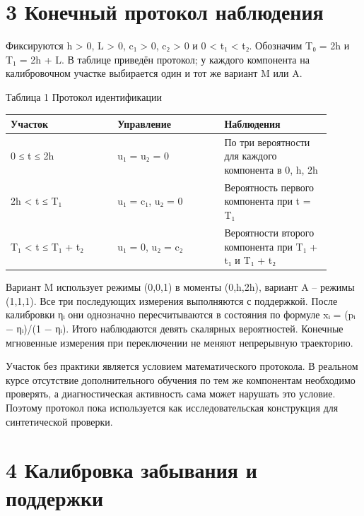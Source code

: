 \documentclass[11pt,a4paper]{article}
\begin{document}
\section*{3 Конечный протокол наблюдения}

Фиксируются h > 0, L > 0, c₁ > 0, c₂ > 0 и 0 < t₁ < t₂. Обозначим T₀ = 2h и T₁ = 2h + L. В таблице приведён протокол; у каждого компонента на калибровочном участке выбирается один и тот же вариант M или A.\par

\begin{center}\small Таблица 1 Протокол идентификации\end{center}

\begin{longtable}{|p{0.300\linewidth}|p{0.300\linewidth}|p{0.300\linewidth}|}\hline

Участок & Управление & Наблюдения\\\hline\endhead

0 ≤ t ≤ 2h & u₁ = u₂ = 0 & По три вероятности для каждого компонента в 0, h, 2h\\\hline

2h < t ≤ T₁ & u₁ = c₁, u₂ = 0 & Вероятность первого компонента при t = T₁\\\hline

T₁ < t ≤ T₁ + t₂ & u₁ = 0, u₂ = c₂ & Вероятности второго компонента при T₁ + t₁ и T₁ + t₂\\\hline

\end{longtable}

Вариант M использует режимы (0,0,1) в моменты (0,h,2h), вариант A – режимы (1,1,1). Все три последующих измерения выполняются с поддержкой. После калибровки ηᵢ они однозначно пересчитываются в состояния по формуле xᵢ = (pᵢ − ηᵢ)/(1 − ηᵢ). Итого наблюдаются девять скалярных вероятностей. Конечные мгновенные измерения при переключении не меняют непрерывную траекторию.\par

Участок без практики является условием математического протокола. В реальном курсе отсутствие дополнительного обучения по тем же компонентам необходимо проверять, а диагностическая активность сама может нарушать это условие. Поэтому протокол пока используется как исследовательская конструкция для синтетической проверки.\par

\section*{4 Калибровка забывания и поддержки}
\end{document}
